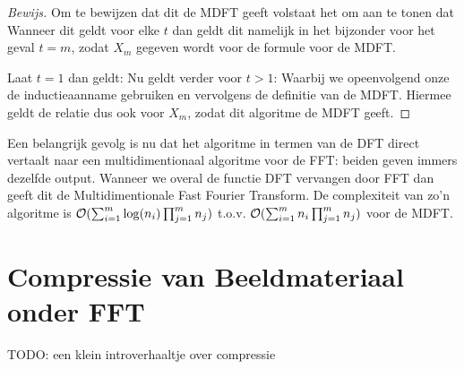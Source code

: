 \begin{proof}[Bewijs]
  Om te bewijzen dat dit de MDFT geeft volstaat het om aan te tonen dat
  Wanneer dit geldt voor elke $t$ dan geldt dit namelijk in het bijzonder voor het geval $t=m$,
  zodat $X_m$ gegeven wordt voor de formule voor de MDFT.

  Laat $t=1$ dan geldt:
  Nu geldt verder voor $t>1$:
  Waarbij we opeenvolgend onze de inductieaanname gebruiken en vervolgens de definitie van de MDFT.
  Hiermee geldt de relatie dus ook voor $X_m$, zodat dit algoritme de MDFT geeft.
\end{proof}

Een belangrijk gevolg is nu dat het algoritme in termen van de DFT direct vertaalt naar een multidimentionaal algoritme voor de FFT: beiden geven immers dezelfde output.
Wanneer we overal de functie DFT vervangen door FFT dan geeft dit de Multidimentionale Fast Fourier Transform.
De complexiteit van zo'n algoritme is $\mathcal{O}( \sum_{i=1}^m \log(n_i) \prod_{j=1}^m n_j)$ t.o.v.
$\mathcal{O}( \sum_{i=1}^m n_i \prod_{j=1}^m n_j)$ voor de MDFT.

\section{Compressie van Beeldmateriaal onder FFT}

TODO: een klein introverhaaltje over compressie

